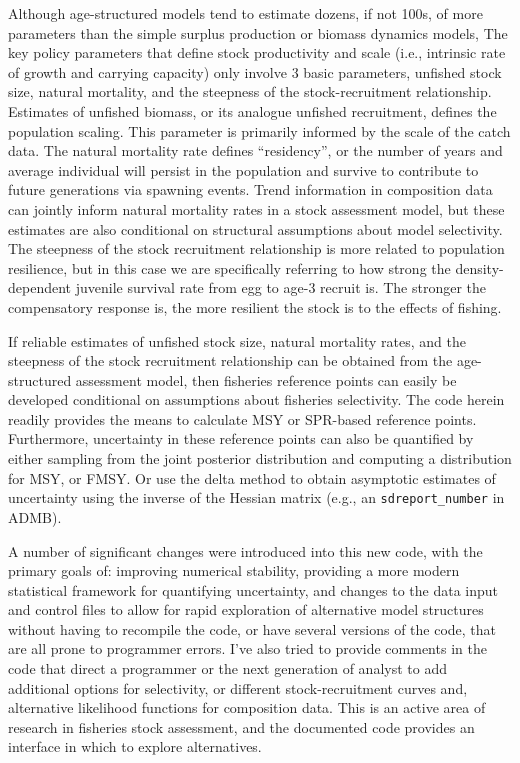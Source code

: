 \documentclass[12pt,letterpaper]{article}
\begin{document}
  Although age-structured models tend to estimate dozens, if not 100s, of more parameters than the simple surplus production or biomass dynamics models, The key policy parameters that define stock productivity and scale (i.e., intrinsic rate of growth and carrying capacity) only involve 3 basic parameters, unfished stock size, natural mortality, and the steepness of the stock-recruitment relationship.  Estimates of unfished biomass, or its analogue unfished recruitment, defines the population scaling. This parameter is primarily informed by the scale of the catch data.  The natural mortality rate defines ``residency'', or the number of years and average individual will persist in the population and survive to contribute to future generations via spawning events.  Trend information in composition data can jointly inform natural mortality rates in a stock assessment model, but these estimates are also conditional on structural assumptions about model selectivity.  The steepness of the stock recruitment relationship is more related to population resilience, but in this case we are specifically referring to how strong the density-dependent juvenile survival rate from egg to age-3 recruit is. The stronger the compensatory response is, the more resilient the stock is to the effects of fishing.

  If reliable estimates of unfished stock size,  natural mortality rates, and the steepness of the stock recruitment relationship can be obtained from the age-structured assessment model, then fisheries reference points can easily be developed conditional on assumptions about fisheries selectivity. The code herein readily provides the means to calculate MSY or SPR-based reference points.  Furthermore, uncertainty in these reference points can also be quantified by either sampling from the joint posterior distribution and computing a distribution for MSY, or FMSY.  Or use the delta method to obtain asymptotic estimates of uncertainty using the inverse of the Hessian matrix (e.g., an \texttt{sdreport\_number} in ADMB).

  A number of significant changes were introduced into this new code, with the primary goals of: improving numerical stability, providing a more modern statistical framework for  quantifying uncertainty, and changes to the data input and control files to allow for rapid exploration of alternative model structures without having to recompile the code, or have several versions of the code, that are all prone to programmer errors.  I've also tried to provide comments in the code that direct a programmer or the next generation of analyst to add additional options for selectivity, or different stock-recruitment curves and, alternative likelihood functions for composition data.  This is an active area of research in fisheries stock assessment, and the documented code provides an interface in which to explore alternatives.
\end{document}
